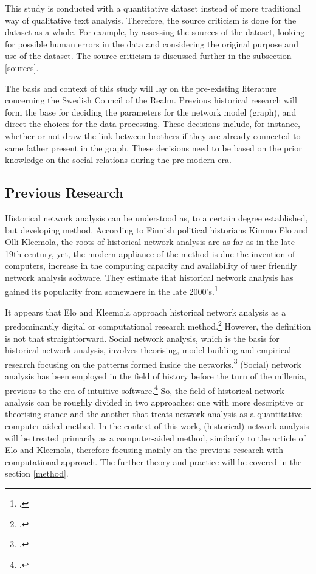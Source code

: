 This study is conducted with a quantitative dataset instead of more traditional way of qualitative text analysis. Therefore, the source criticism is done for the dataset as a whole. For example, by assessing the sources of the dataset, looking for possible human errors in the data and considering the original purpose and use of the dataset. The source criticism is discussed further in the subsection \ref{sources}.

The basis and context of this study will lay on the pre-existing literature concerning the Swedish Council of the Realm. Previous historical research will form the base for deciding the parameters for the network model (graph), and direct the choices for the data processing. These decisions include, for instance, whether or not draw the link between brothers if they are already connected to same father present in the graph. These decisions need to be based on the prior knowledge on the social relations during the pre-modern era. 

\subsection{Previous Research}
Historical network analysis can be understood as, to a certain degree established, but developing method. According to Finnish political historians Kimmo Elo and Olli Kleemola, the roots of historical network analysis are as far as in the late 19th century, yet, the modern appliance of the method is due the invention of computers, increase in the computing capacity and availability of user friendly network analysis software. They estimate that historical network analysis has gained its popularity from somewhere in the late 2000's.\footcite[p. 415-417.]{eloAklee15} 

It appears that Elo and Kleemola approach historical network analysis as a predominantly digital or computational research method.\footcite[p. 415-417.]{eloAklee15} However, the definition is not that straightforward. Social network analysis, which is the basis for historical network analysis, involves theorising, model building and empirical research focusing on the patterns formed inside the networks.\footcite[p. 22-24.]{Keats-R2007} (Social) network analysis has been employed in the field of history before the turn of the millenia, previous to the era of intuitive software.\footcite[TODO check!]{AronssonEtA1999} So, the field of historical network analysis can be roughly divided in two approaches: one with more descriptive or theorising stance and the another that treats network analysis as a quantitative computer-aided method. In the context of this work, (historical) network analysis will be treated primarily as a computer-aided method, similarily to the article of Elo and Kleemola, therefore focusing mainly on the previous research with computational approach. The further theory and practice will be covered in the section \ref{method}.

